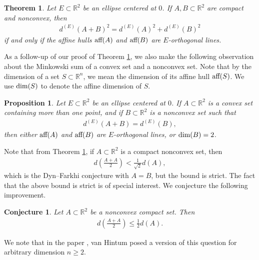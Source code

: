 \documentclass[11pt]{article}
\newtheorem{theorem}{Theorem}[section]
\newtheorem{proposition}{Proposition}[section]
\newtheorem{conjecture}{Conjecture}[section]
\begin{document}
\begin{theorem}\label{theorem:equality_conditions}
    Let $E\subset\mathbb{R}^2$ be an ellipse centered at $0$. If $A,B\subset\mathbb{R}^2$ are compact and nonconvex, then
    \begin{align*}
        d^{(E)}(A+B)^2=d^{(E)}(A)^2+d^{(E)}(B)^2
    \end{align*}
    if and only if the affine hulls $\textup{aff}(A)$ and $\textup{aff}(B)$ are $E$-orthogonal lines.
\end{theorem}

As a follow-up of our proof of Theorem \ref{theorem:equality_conditions}, we also make the following observation about the Minkowski sum of a convex set and a nonconvex set. Note that by the dimension of a set $S\subset\mathbb{R}^n$, we mean the dimension of its affine hull $\textup{aff}(S)$. We use $\textup{dim}(S)$ to denote the affine dimension of $S$.

\begin{proposition}\label{proposition:convex+nonconvex}
    Let $E\subset\mathbb{R}^2$ be an ellipse centered at $0$. If $A\subset\mathbb{R}^2$ is a convex set containing more than one point, and if $B\subset\mathbb{R}^2$ is a nonconvex set such that
    \begin{align*}
        d^{(E)}(A+B)=d^{(E)}(B),
    \end{align*}
    then either $\textup{aff}(A)$ and $\textup{aff}(B)$ are $E$-orthogonal lines, or $\textup{dim}(B)=2$.
\end{proposition}

Note that from Theorem \ref{theorem:equality_conditions}, if $A\subset\mathbb{R}^2$ is a compact nonconvex set, then
\begin{align*}
    d\left(\frac{A+A}{2}\right)<\frac{1}{\sqrt{2}}d(A),
\end{align*}
which is the Dyn--Farkhi conjecture with $A=B$, but the bound is strict. The fact that the above bound is strict is of special interest. We conjecture the following improvement.

\begin{conjecture}\label{conjecture:improved_constant_symmetric_case}
    Let $A\subset\mathbb{R}^2$ be a nonconvex compact set. Then
    \begin{align*}
        d\left(\frac{A+A}{2}\right)\leq \frac{1}{2}d(A).
    \end{align*}
\end{conjecture}
We note that in the paper \cite{vanHintum}, van Hintum posed a version of this question for arbitrary dimension $n\geq 2$.
\end{document}
